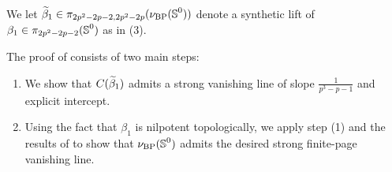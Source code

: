 \begin{ntn}
    We let $\wt{\beta}_1 \in \pi_{2p^2-2p-2,2p^2-2p} (\nu_{\BP} (\Ss^0))$ denote a synthetic lift of $\beta_1 \in \pi_{2p^2-2p-2} (\operatorname{\mathbb{S}}^0)$ as in (3).
\end{ntn}
The proof of  consists of two main steps:
\begin{enumerate}
    \item We show that $C(\wt{\beta}_1)$ admits a strong vanishing line of slope $\frac{1}{p^3-p-1}$ and explicit intercept.
    \item Using the fact that $\beta_1$ is nilpotent topologically, we apply step (1) and the results of  to show that $\nu_{\mathrm{BP}} (\operatorname{\mathbb{S}}^0)$ admits the desired strong finite-page vanishing line.
\end{enumerate}



